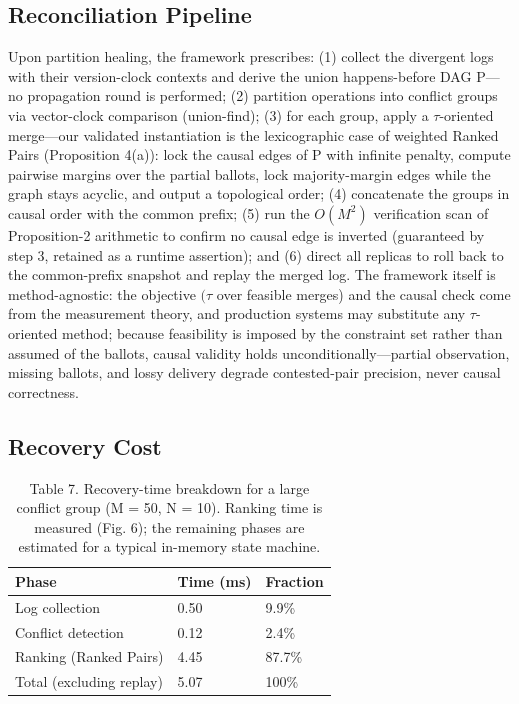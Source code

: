 \documentclass[10pt,twocolumn]{article}
\begin{document}
\subsection{Reconciliation Pipeline}
Upon partition healing, the framework prescribes: (1) collect the divergent logs with their version-clock contexts and derive the union happens-before DAG P—no propagation round is performed; (2) partition operations into conflict groups via vector-clock comparison (union-find); (3) for each group, apply a $\tau$-oriented merge—our validated instantiation is the lexicographic case of weighted Ranked Pairs (Proposition 4(a)): lock the causal edges of P with infinite penalty, compute pairwise margins over the partial ballots, lock majority-margin edges while the graph stays acyclic, and output a topological order; (4) concatenate the groups in causal order with the common prefix; (5) run the $O(M^{2})$ verification scan of Proposition-2 arithmetic to confirm no causal edge is inverted (guaranteed by step 3, retained as a runtime assertion); and (6) direct all replicas to roll back to the common-prefix snapshot and replay the merged log. The framework itself is method-agnostic: the objective $(\tau$ over feasible merges) and the causal check come from the measurement theory, and production systems may substitute any $\tau$-oriented method; because feasibility is imposed by the constraint set rather than assumed of the ballots, causal validity holds unconditionally—partial observation, missing ballots, and lossy delivery degrade contested-pair precision, never causal correctness.

\subsection{Recovery Cost}
\begin{table}[t]
\centering
\caption{Table 7. Recovery-time breakdown for a large conflict group (M = 50, N = 10). Ranking time is measured (Fig. 6); the remaining phases are estimated for a typical in-memory state machine.}
\begin{tabular}{lll}
\hline
Phase & Time (ms) & Fraction \\
\hline
Log collection & 0.50 & 9.9\% \\
Conflict detection & 0.12 & 2.4\% \\
Ranking (Ranked Pairs) & 4.45 & 87.7\% \\
Total (excluding replay) & 5.07 & 100\% \\
\hline
\end{tabular}
\end{table}
\end{document}
